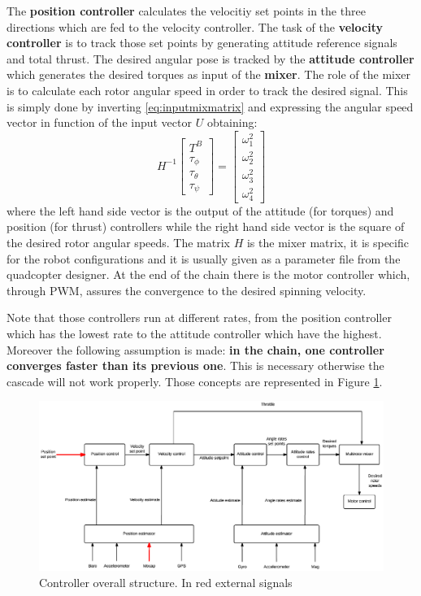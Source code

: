 The \textbf{position controller} calculates the velocitiy set points in the three directions which are fed to the velocity controller. The task of the \textbf{velocity controller} is to track those set points by generating attitude reference signals and total thrust. The desired angular pose is tracked by the \textbf{attitude controller} which generates the desired torques as input of the \textbf{mixer}. The role of the mixer is to calculate each rotor angular speed in order to track the desired signal. This is simply done by inverting  \eqref{eq:inputmixmatrix} and expressing the angular speed vector in function of the input vector $U$ obtaining:\begin{equation}
H^{-1}\begin{bmatrix}
T^B\\\tau_\phi\\\tau_\theta\\\tau_\psi
\end{bmatrix} = \begin{bmatrix}
\omega_1^2\\\omega_2^2\\\omega_3^2\\\omega_4^2
\end{bmatrix}
\end{equation}
where the left hand side vector is the output of the attitude (for torques) and position (for thrust) controllers while the right hand side vector is the square of the desired rotor angular speeds. The matrix $H$ is the mixer matrix, it is specific for the robot configurations and it is usually given as a parameter file from the quadcopter designer. At the end of the chain there is the motor controller which, through PWM, assures the convergence to the desired spinning velocity. 

Note that those controllers run at different rates, from the position controller which has the lowest rate to the attitude controller which have the highest. Moreover the following assumption is made: \textbf{in the chain, one controller converges faster than its previous one}. This is necessary otherwise the cascade will not work properly. Those concepts are represented in Figure \ref{figure:controlarch}.

\begin{figure}[h]
	\centering
	\noindent
	\includegraphics[width=1\textwidth]{arch.eps}
	\caption{Controller overall structure. In red external signals}
	\label{figure:controlarch}
\end{figure}

